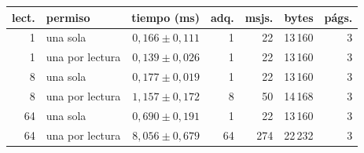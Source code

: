 \begin{tabular}{@{}rlrrrrr@{}}
\toprule
lect. & permiso & tiempo (ms) & adq. & msjs. & bytes & págs. \\
\midrule
1 & una sola & $0,166 \pm 0,111$ & 1 & 22 & 13\,160 & 3 \\
1 & una por lectura & $0,139 \pm 0,026$ & 1 & 22 & 13\,160 & 3 \\
8 & una sola & $0,177 \pm 0,019$ & 1 & 22 & 13\,160 & 3 \\
8 & una por lectura & $1,157 \pm 0,172$ & 8 & 50 & 14\,168 & 3 \\
64 & una sola & $0,690 \pm 0,191$ & 1 & 22 & 13\,160 & 3 \\
64 & una por lectura & $8,056 \pm 0,679$ & 64 & 274 & 22\,232 & 3 \\
\bottomrule
\end{tabular}
